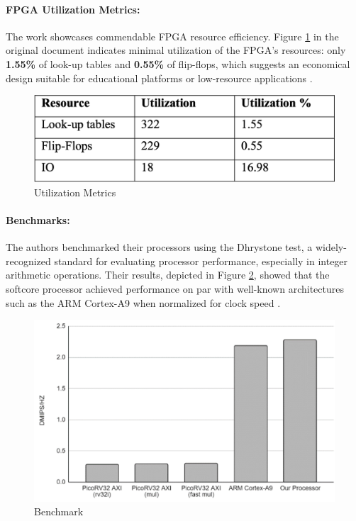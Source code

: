 \documentclass[conference]{IEEEtran}
\begin{document}
\paragraph{FPGA Utilization Metrics:}
The work showcases commendable FPGA resource efficiency. Figure \ref{eff} in the original document indicates minimal utilization of the FPGA's resources: only \textbf{1.55\%} of look-up tables and \textbf{0.55\%} of flip-flops, which suggests an economical design suitable for educational platforms or low-resource applications \cite{13}.

\begin{figure}[ht]
\begin{center}
  \includegraphics[scale=0.15]{Screenshot 2023-11-23 at 00.20.17 (1).png}
\end{center}
  \caption{Utilization Metrics\cite{13}}
  \label{eff}
\end{figure}



\paragraph{Benchmarks:}
The authors benchmarked their processors using the Dhrystone test, a widely-recognized standard for evaluating processor performance, especially in integer arithmetic operations. Their results, depicted in Figure \ref{ben}, showed that the softcore processor achieved performance on par with well-known architectures such as the ARM Cortex-A9 when normalized for clock speed \cite{13}.
\begin{figure}[ht]
\begin{center}
  \includegraphics[scale=0.15]{Screenshot 2023-11-23 at 00.20.48 (1).png}
\end{center}
  \caption{Benchmark\cite{13}}
  \label{ben}
\end{figure}
\end{document}
